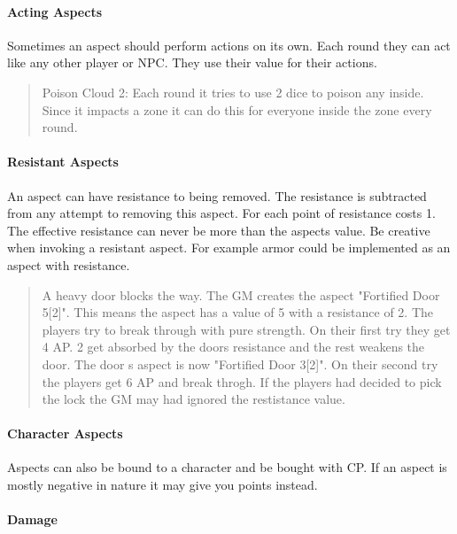 \documentclass[11pt]{article}
\begin{document}
{\paragraph*{Acting Aspects}
\label{sec:org61ce6b4}

Sometimes an aspect should perform actions on its own. Each round they can act like any other player or NPC. They use their value for their actions.

\begin{quote}
Poison Cloud 2: Each round it tries to use 2 dice to poison any inside. Since it impacts a zone it can do this for everyone inside the zone every round.
\end{quote}

\paragraph*{Resistant Aspects}
\label{sec:orgc2d0d14}

An aspect can have resistance to being removed. The resistance is subtracted from any attempt to removing this aspect. For each point of resistance costs 1. The effective resistance can never be more than the aspects value. Be creative when invoking a resistant aspect. For example armor could be implemented as an aspect with resistance.

\begin{quote}
A heavy door blocks the way. The GM creates the aspect "Fortified Door 5[2]". This means the aspect has a value of 5 with a resistance of 2. The players try to break through with pure strength. On their first try they get 4 AP. 2 get absorbed by the doors resistance and the rest weakens the door. The door s aspect is now "Fortified Door 3[2]". On their second try the players get 6 AP and break throgh.
If the players had decided to pick the lock the GM may had ignored the restistance value.
\end{quote}


\paragraph*{Character Aspects}
\label{sec:org30b6ee2}

Aspects can also be bound to a character and be bought with CP. If an aspect is mostly negative in nature it may give you points instead.

\paragraph*{Damage}
\label{sec:org5e5ca74}

}
\end{document}
